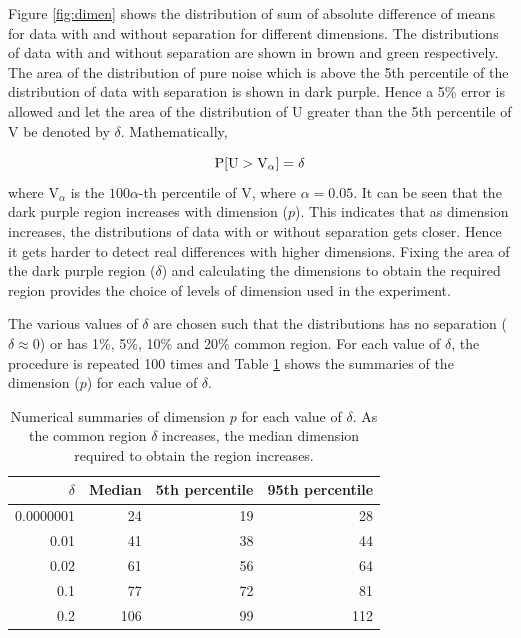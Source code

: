 Figure \ref{fig:dimen} shows the distribution of sum of absolute difference of means for data with and without separation for different dimensions. The distributions of data with and without separation are shown in brown and green respectively. The area of the distribution of pure noise which is above the 5th percentile of the distribution of data with separation is shown in dark purple.  Hence a 5\% error is allowed and let the area of the distribution of U greater than the 5th percentile of V be denoted by $\delta$. Mathematically, 

$$\hbox{P}[\mbox{U} > \mbox{V}_{\alpha}] = \delta$$ where $\mbox{V}_{\alpha}$ is the $100\alpha$-th percentile of V, where $\alpha = 0.05$.  It can be seen that the dark purple region increases with dimension ($p$). This indicates that as dimension increases, the distributions of data with or without separation gets closer. Hence it gets harder to detect real differences with higher dimensions. Fixing the area of the dark purple region ($\delta$) and calculating the dimensions to obtain the required region provides the choice of levels of dimension used in the experiment.


The various values of $\delta$ are chosen such that the distributions has no separation ($\delta \approx 0$) or has 1\%, 5\%, 10\% and 20\% common region. For each value of $\delta$, the procedure is repeated 100 times and Table \ref{tab:dimen} shows the summaries of the dimension ($p$) for each value of $\delta$.

\begin{table}[htbp]
\begin{center}
\caption{Numerical summaries of dimension $p$ for each value of $\delta$. As the common region $\delta$ increases, the median dimension required to obtain the region increases.}
\begin{tabular}{rrrr}
  \hline
  \hline
  $\delta$ & Median & 5th percentile & 95th percentile \\
  \hline
  0.0000001 & 24 & 19 & 28 \\
      0.01 & 41 & 38 & 44\\
   0.02 & 61 & 56 & 64 \\
     0.1 & 77 & 72 & 81\\   
     0.2 & 106 & 99 & 112\\ 
      \hline
\end{tabular}
\label{tab:dimen}
\end{center}
\end{table}
